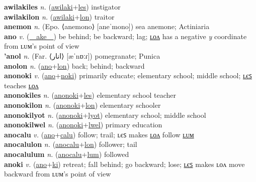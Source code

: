 \textbf{awilakiles} \textit{n.} (\hyperref[awilaki]{awilaki}+\hyperref[les]{les})
instigator \label{awilakiles} \\
\textbf{awilakilon} \textit{n.} (\hyperref[awilaki]{awilaki}+\hyperref[lon]{lon})
traitor \label{awilakilon} \\
\textbf{anemon} \textit{n.} (Epo. ⟨anemono⟩ [aneˈmono])
sea anemone; Actiniaria \label{anemon} \\
\textbf{ano} \textit{v.} (\hyperref[ake]{~~ake~~})
be behind; be backward; lag; \hyperref[anolon]{ʟᴏᴧ} has a negative \textit{y} coordinate from ʟᴜᴍ’s point of view \label{ano} \\
\textbf{'anol} \textit{n.} (Far. ⟨انار⟩ [æˈnɒːɾ])
pomegranate; Punica \label{'anol} \\
\textbf{anolon} \textit{n.} (\hyperref[ano]{ano}+\hyperref[lon]{lon})
back; behind; backward \label{anolon} \\
\textbf{anonoki} \textit{v.} (\hyperref[ano]{ano}+\hyperref[noki]{noki})
primarily educate; elementary school; middle school; \hyperref[anonokiles]{ʟєꜱ} teaches \hyperref[anonokilon]{ʟᴏᴧ} \label{anonoki} \\
\textbf{anonokiles} \textit{n.} (\hyperref[anonoki]{anonoki}+\hyperref[les]{les})
elementary school teacher \label{anonokiles} \\
\textbf{anonokilon} \textit{n.} (\hyperref[anonoki]{anonoki}+\hyperref[lon]{lon})
elementary schooler \label{anonokilon} \\
\textbf{anonokilyot} \textit{n.} (\hyperref[anonoki]{anonoki}+\hyperref[lyot]{lyot})
elementary school; middle school \label{anonokilyot} \\
\textbf{anonokilwel} \textit{n.} (\hyperref[anonoki]{anonoki}+\hyperref[lwel]{lwel})
primary education \label{anonokilwel} \\
\textbf{anocalu} \textit{v.} (\hyperref[ano]{ano}+\hyperref[calu]{calu})
follow; trail; ʟєꜱ makes \hyperref[anocalulon]{ʟᴏᴧ} follow \hyperref[anocalulum]{ʟᴜᴍ} \label{anocalu} \\
\textbf{anocalulon} \textit{n.} (\hyperref[anocalu]{anocalu}+\hyperref[lon]{lon})
follower; tail \label{anocalulon} \\
\textbf{anocalulum} \textit{n.} (\hyperref[anocalu]{anocalu}+\hyperref[lum]{lum})
followed \label{anocalulum} \\
\textbf{anoki} \textit{v.} (\hyperref[ano]{ano}+\hyperref[ki]{ki})
retreat; fall behind; go backward; lose; \hyperref[anokiles]{ʟєꜱ} makes ʟᴏᴧ move backward from ʟᴜᴍ’s point of view \label{anoki} \\
